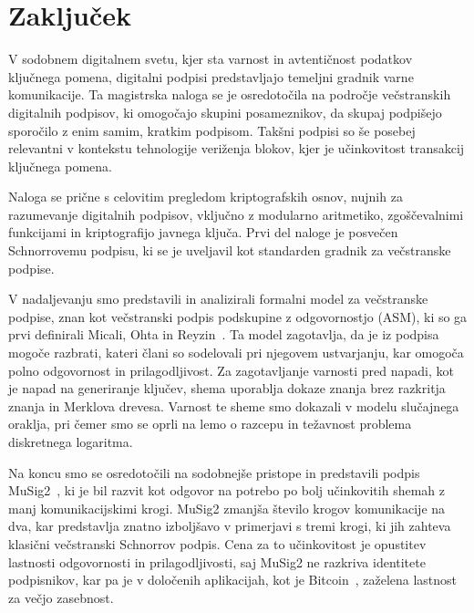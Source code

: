 \section{Zaključek}
V sodobnem digitalnem svetu, kjer sta varnost in avtentičnost podatkov ključnega pomena, digitalni
podpisi predstavljajo temeljni gradnik varne komunikacije. Ta magistrska naloga se je osredotočila
na področje večstranskih digitalnih podpisov, ki omogočajo skupini posameznikov, da skupaj podpišejo
sporočilo z enim samim, kratkim podpisom. Takšni podpisi so še posebej relevantni v kontekstu
tehnologije veriženja blokov, kjer je učinkovitost transakcij ključnega pomena.

Naloga se prične s celovitim pregledom kriptografskih osnov, nujnih za razumevanje digitalnih podpisov,
vključno z modularno aritmetiko, zgoščevalnimi funkcijami in kriptografijo javnega ključa. Prvi del
naloge je posvečen Schnorrovemu podpisu, ki se je uveljavil kot standarden gradnik za večstranske
podpise.

V nadaljevanju smo predstavili in analizirali formalni model za večstranske podpise, znan kot večstranski
podpis podskupine z odgovornostjo (ASM), ki so ga prvi definirali Micali, Ohta in Reyzin~\cite{micali2001asm}.
Ta model zagotavlja, da je iz podpisa mogoče razbrati, kateri člani so sodelovali pri njegovem
ustvarjanju, kar omogoča polno odgovornost in prilagodljivost. Za zagotavljanje varnosti pred napadi,
kot je napad na generiranje ključev, shema uporablja dokaze znanja brez razkritja znanja in Merklova
drevesa. Varnost te sheme smo dokazali v modelu slučajnega oraklja, pri čemer smo se oprli na lemo o
razcepu in težavnost problema diskretnega logaritma.

Na koncu smo se osredotočili na sodobnejše pristope in predstavili podpis MuSig2~\cite{jonas2020musig2},
ki je bil razvit kot odgovor na potrebo po bolj učinkovitih shemah z manj komunikacijskimi krogi.
MuSig2 zmanjša število krogov komunikacije na dva, kar predstavlja znatno izboljšavo v primerjavi s
tremi krogi, ki jih zahteva klasični večstranski Schnorrov podpis. Cena za to učinkovitost je opustitev
lastnosti odgovornosti in prilagodljivosti, saj MuSig2 ne razkriva identitete podpisnikov, kar pa je
v določenih aplikacijah, kot je Bitcoin~\cite{nakamoto2009bitcoin}, zaželena lastnost za večjo zasebnost.

